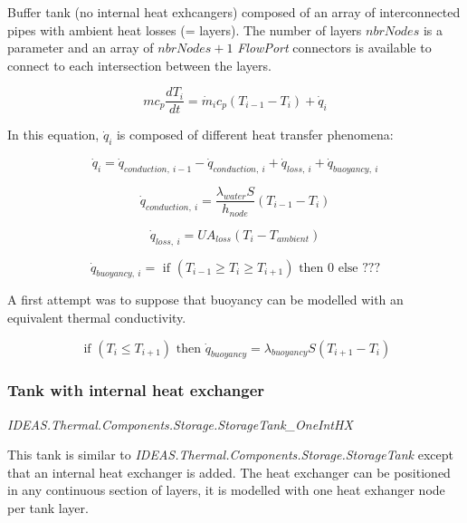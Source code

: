 Buffer tank (no internal heat exhcangers) composed of an array of interconnected pipes with ambient heat losses (= layers).  The number of layers $nbrNodes$ is a parameter and an array of $nbrNodes + 1$ \emph{FlowPort} connectors is available to connect to each intersection between the layers. 

\begin{equation}
mc_p \frac{dT_i}{dt}=\dot{m}_ic_p(T_{i-1} - T_i) + \dot{q}_i
\label{eq:}
\end{equation}

In this equation, $\dot{q}_i$ is composed of different heat transfer phenomena:

\begin{equation}
\dot{q}_i = \dot{q}_{conduction,~i-1} - \dot{q}_{conduction,~i} + \dot{q}_{loss,~i} +  \dot{q}_{buoyancy,~i}
\label{eq:}
\end{equation}

\begin{equation}
\dot{q}_{conduction,~i} = \frac{\lambda_{water} S}{h_{node}} (T_{i-1} - T_i) 
\label{eq:}
\end{equation}

\begin{equation}
\dot{q}_{loss,~i} = UA_{loss}(T_{i} - T_{ambient}) 
\label{eq:}
\end{equation}

\begin{equation}
\dot{q}_{buoyancy,~i} = \text{ if } (T_{i-1} \geq T_i \geq T_{i+1}) \text{ then } 0 \text{ else } ???
\label{eq:}
\end{equation}

A first attempt was to suppose that buoyancy can be modelled with an equivalent thermal conductivity. 

\begin{equation}
\text{ if } (T_{i} \leq T_{i+1}) \text{ then } \dot{q}_{buoyancy} = \lambda_{buoyancy} S (T_{i+1}-T_i)
\label{eq:}
\end{equation}


\subsubsection{Tank with internal heat exchanger}

\emph{IDEAS.Thermal.Components.Storage.StorageTank_OneIntHX}

\vspace{6mm}

This tank is similar to \emph{IDEAS.Thermal.Components.Storage.StorageTank} except that an internal heat exchanger is added.  The heat exchanger can be positioned in any continuous section of layers, it is modelled with one heat exhanger node per tank layer. 

